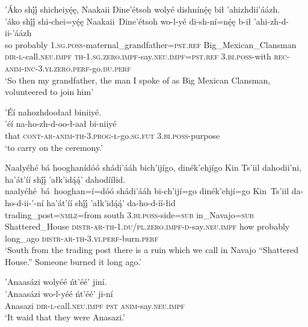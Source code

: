 \ea\label{ex:text1-26-1}
’Áko shį́į́ shicheiyę́ę, Naakaii Dine’étsoh wolyé dishnínę́ę bił ’ahizhdii’áázh.\\
\gll ’áko	shį́į́	shi-chei=yę́ę	Naakaii~{Dine’étsoh}	wo-l-yé	di-sh-ní=nę́ę	b-ił	’ahi-zh-d-ii-’áázh\\
     so	probably	1.\textsc{sg}.\textsc{poss}-maternal\_grandfather=\textsc{pst}.\textsc{ref}	Big\_Mexican\_Clansman	\textsc{dir}-\textsc{l}-call.\textsc{neu}.\textsc{impf}	\textsc{th}-1.\textsc{sg}.\textsc{zero}.\textsc{impf}-say.\textsc{neu}.\textsc{impf}=\textsc{pst}.\textsc{ref}	3.\textsc{bi}.\textsc{poss}-with	\textsc{rec}-\textsc{anim}-\textsc{inc}-3.\textsc{yi}.\textsc{zero}.\textsc{perf}-go.\textsc{du}.\textsc{perf}\\
\glt `So then my grandfather, the man I spoke of as Big Mexican Clansman, volunteered to join him'
\z

\ea\label{ex:text1-26-2}
’Éí nahozhdoołaał biniiyé.\\
\gll ’éí	na-ho-zh-d-oo-ł-aał	bi-niiyé\\
     that	\textsc{cont}-\textsc{ar}-\textsc{anim}-\textsc{th}-3.\textsc{prog}-\textsc{ł}-go.\textsc{sg}.\textsc{fut}	3.\textsc{bi}.\textsc{poss}-purpose\\
\glt `to carry on the ceremony.'
\z

\ea\label{ex:text1-26-3}
Naalyéhé bá hooghanídóó shádi’ááh bich’ijígo, dinék’ehjígo Kin Ts’iil dahodii’ni, ha’át’íí shį́į́ ’ałk’idą́ą́’ dahodííłid.\\
\gll naalyéhé~bá~{hooghan=í=dóó}	shádi’ááh	bi-ch’ijí=go	dinék’ehjí=go	Kin~{Ts’iil}	da-ho-d-ii-’-ní	ha’át’íí	shį́į́	’ałk’idą́ą́’	da-ho-d-íí-łid\\
     trading\_post=\textsc{nmlz}=from	south	3.\textsc{bi}.\textsc{poss}-side=\textsc{sub}	in\_Navajo=\textsc{sub}	Shattered\_House	\textsc{distr}-\textsc{ar}-\textsc{th}-1.\textsc{du}/\textsc{pl}.\textsc{zero}.\textsc{impf}-\textsc{d}-say.\textsc{neu}.\textsc{impf}	how	probably	long\_ago	\textsc{distr}-\textsc{ar}-\textsc{th}-3.\textsc{yi}.\textsc{perf}-burn.\textsc{perf}\\
\glt `South from the trading post there is a ruin which we call in Navajo ``Shattered House.'' Someone burned it long ago.'
\z

\newpage
\ea\label{ex:text1-26-4}
’Anaasázi wolyéé ńt’éé’ jiní.\\
\gll ’Anaasázi	wo-l-yéé	ńt’éé’	ji-ní\\
     Anasazi	\textsc{dir}-\textsc{l}-call.\textsc{neu}.\textsc{impf}	\textsc{pst}	\textsc{anim}-say.\textsc{neu}.\textsc{impf}\\
\glt `It waid that they were Anasazi.'
\z

